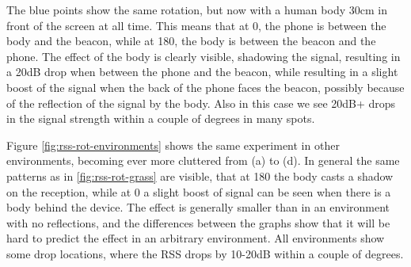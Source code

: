 The blue points show the same rotation, but now with a human body 30cm in front of the screen at all time.
This means that at 0\textdegree{}, the phone is between the body and the beacon, while at 180\textdegree{}, the body is between the beacon and the phone.
The effect of the body is clearly visible, shadowing the signal, resulting in a 20dB drop when between the phone and the beacon, while resulting in a slight boost of the signal when the back of the phone faces the beacon, possibly because of the reflection of the signal by the body.
Also in this case we see 20dB+ drops in the signal strength within a couple of degrees in many spots.


Figure \ref{fig:rss-rot-environments} shows the same experiment in other environments, becoming ever more cluttered from (a) to (d).
In general the same patterns as in \ref{fig:rss-rot-grass} are visible, that at 180\textdegree{} the body casts a shadow on the reception, while at 0\textdegree{} a slight boost of signal can be seen when there is a body behind the device.
The effect is generally smaller than in an environment with no reflections, and the differences between the graphs show that it will be hard to predict the effect in an arbitrary environment.
All environments show some drop locations, where the RSS drops by 10-20dB within a couple of degrees.

